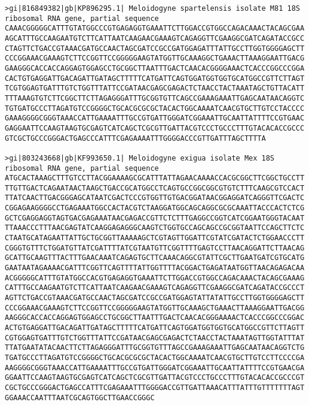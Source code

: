 \documentclass[11pt]{article}
\begin{document}
\begin{Verbatim}[commandchars=\\\{\}]
>gi|816849382|gb|KP896295.1| Meloidogyne spartelensis isolate M81 18S ribosomal RNA gene, partial sequence
CAAACGGGGGCATTTGTATGGCCCGTGAGAGGTGAAATTCTTGGACCGTGGCCAGACAAACTACAGCGAA
AGCATTTGCCAAGAATGTCTTCATTAATCAAGAACGAAAGTCAGAGGTTCGAAGGCGATCAGATACCGCC
CTAGTTCTGACCGTAAACGATGCCAACTAGCGATCCGCCGATGGAGATTTATTGCCTTGGTGGGGAGCTT
CCCGGAAACGAAAGTCTTCCGGTTCCGGGGGAAGTATGGTTGCAAAGGCTGAAACTTAAAGGAATTGACG
GAAGGGCACCACCAGGAGTGGAGCCTGCGGCTTAATTTGACTCAACACGGGGAAACTCACCCGGCCCGGA
CACTGTGAGGATTGACAGATTGATAGCTTTTTCATGATTCAGTGGATGGTGGTGCATGGCCGTTCTTAGT
TCGTGGAGTGATTTGTCTGGTTTATTCCGATAACGAGCGAGACTCTAACCTACTAAATAGCTGTTACATT
TTTAAAGTGTCTTCGGCTTCTTAGAGGGATTTGCGGTGTTCAGCCGAAAGAAATTGAGCAATAACAGGTC
TGTGATGCCCTTAGATGTCCGGGGCTGCACGCGCGCTACACTGGCAAAATCAACGTGCTTGTCCTACCCC
GAAAGGGGCGGGTAAACCATTGAAAATTTGCCGTGATTGGGATCGGAAATTGCAATTATTTTCCGTGAAC
GAGGAATTCCAAGTAAGTGCGAGTCATCAGCTCGCGTTGATTACGTCCCTGCCCTTTGTACACACCGCCC
GTCGCTGCCCGGGACTGAGCCCATTTCGAGAAAATTTGGGGACCCGTTGATTTAGCTTTTA

>gi|803243668|gb|KF993650.1| Meloidogyne exigua isolate Mex 18S ribosomal RNA gene, partial sequence
ATGCACTAAAGCTTTGTCCTTACGGAAAAGCGCATTTATTAGAACAAAACCACGCGGCTTCGGCTGCCTT
TTGTTGACTCAGAATAACTAAGCTGACCGCATGGCCTCAGTGCCGGCGGCGTGTCTTTCAAGCGTCCACT
TTATCAACTTGACGGGAGCATAATCGACTCCCGTGGTTGTGACGGATAACGGAGGATCAGGGTTCGACTC
CGGAGAAGGGGCCTGAGAAATGGCCACTACGTCTAAGGATGGCAGCAGGCGCGCAAATTACCCACTCTCG
GCTCGAGGAGGTAGTGACGAGAAATAACGAGACCGTTCTCTTTGAGGCCGGTCATCGGAATGGGTACAAT
TTAAACCCTTTAACGAGTATCAAGGAGAGGGCAAGTCTGGTGCCAGCAGCCGCGGTAATTCCAGCTTCTC
CTAATGCATAGAATTATTGCTGCGGTTAAAAAGCTCGTAGTTGGATTCGTATCGATACTCTGGAACCCTT
CGGGTGTTTCTGGATGTTATCGATTTTATCGTAATGTTCGGTTTTGAGTCCTTAACAGGATTCTTAACAG
GCATTGCAAGTTTACTTTGAACAAATCAGAGTGCTTCAAACAGGCGTATTCGCTTGAATGATCGTGCATG
GAATAATAGAAAACGATTTCGGTTCAGTTTTATTGGTTTTACGGACTGAGATAATGGTTAACAGAGACAA
ACGGGGGCATTTGTATGGCCACGTGAGAGGTGAAATTCTTGGACCGTGGCCAGACAAACTACAGCGAAAG
CATTTGCCAAGAATGTCTTCATTAATCAAGAACGAAAGTCAGAGGTTCGAAGGCGATCAGATACCGCCCT
AGTTCTGACCGTAAACGATGCCAACTAGCGATCCGCCGATGGAGTATTATATTGCCTTGGTGGGGAGCTT
CCCGGAAACGAAAGTCTTCCGGTTCCGGGGGAAGTATGGTTGCAAAGCTGAAACTTAAAGGAATTGACGG
AAGGGCACCACCAGGAGTGGAGCCTGCGGCTTAATTTGACTCAACACGGGAAAACTCACCCGGCCCGGAC
ACTGTGAGGATTGACAGATTGATAGCTTTTTCATGATTCAGTGGATGGTGGTGCATGGCCGTTCTTAGTT
CGTGGAGTGATTTGTCTGGTTTATTCCGATAACGAGCGAGACTCTAACCTACTAAATAGTTGGTATTTAT
TTATGAATATACAACTTCTTAGAGGGATTTGCGGTGTTTAGCCGAAAGAAATTGAGCAATAACAGGTCTG
TGATGCCCTTAGATGTCCGGGGCTGCACGCGCGCTACACTGGCAAAATCAACGTGCTTGTCCTTCCCCGA
AAGGGGCGGGTAAACCATTGAAAATTTGCCGTGATTGGGATCGGAAATTGCAATTATTTTCCGTGAACGA
GGAATTCCAAGTAAGTGCGAGTCATCAGCTCGCGTTGATTACGTCCCTGCCCTTTGTACACACCGCCCGT
CGCTGCCCGGGACTGAGCCATTTCGAGAAATTTGGGGACCGTTGATTAAACATTTATTTGTTTTTTTAGT
GGAAACCAATTTAATCGCAGTGGCTTGAACCGGGC


\end{Verbatim}
\end{document}
